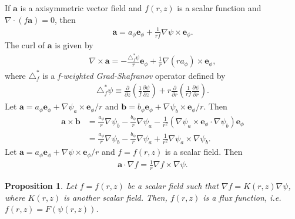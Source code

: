 \documentclass[reqno]{amsart}
\newcommand{\pfrac}[2]{\frac{\partial #1}{\partial #2}}
\newcommand{\mvec}[1]{\mathbf{#1}}
\newcommand{\eep}{\mvec{e}_\phi}
\newtheorem{prop}{Proposition}
\theoremstyle{definition}
\begin{document}
If $\mvec{a}$ is a axisymmetric vector field and $f(r,z)$ is a
scalar function and $\nabla \cdot (f\mvec{a}) = 0$, then
\begin{align}
  \mvec{a} = a_\phi \eep + \frac{1}{rf}\nabla\psi \times \eep.
\end{align}
The curl of $\mvec{a}$ is given by
\begin{align}
  \nabla\times\mvec{a} = -\frac{\triangle^*_f\psi}{r}\eep
  + \frac{1}{r} \nabla(ra_\phi)\times\eep, \label{eq:curlaf}
\end{align}
where $\triangle^*_f$ is a \emph{f-weighted Grad-Shafranov} operator
defined by
\begin{align}
  \triangle^*_f\psi \equiv 
  \frac{\partial}{\partial z}\left(\frac{1}{f} \pfrac{\psi}{z}\right)
  + r \frac{\partial}{\partial r}\left(\frac{1}{rf} \pfrac{\psi}{r}\right).
\end{align}
Let $\mvec{a}=a_\phi\eep + \nabla\psi_a \times \eep/r$ and $\mvec{b}=b_\phi\eep +
\nabla\psi_b \times \eep/r$. Then 
\begin{align}
  \mvec{a}\times\mvec{b} &=
  \frac{a_\phi}{r}\nabla\psi_b
  -
  \frac{b_\phi}{r}\nabla\psi_a
  -\frac{1}{r^2}(\nabla\psi_a \times \eep \cdot \nabla\psi_b)\eep \\
  &= \frac{a_\phi}{r}\nabla\psi_b
  -
  \frac{b_\phi}{r}\nabla\psi_a
  +\frac{1}{r^2}\nabla\psi_a \times \nabla\psi_b.
\end{align}
Let $\mvec{a}=a_\phi\eep + \nabla\psi \times \eep/r$ and $f=f(r,z)$ is
a scalar field. Then
\begin{align}
  \mvec{a}\cdot\nabla f = \frac{1}{r} \nabla f \times \nabla{\psi}.
\end{align}

\begin{prop}
  Let $f=f(r,z)$ be a scalar field such that $\nabla f = K(r,z) \nabla
  \psi$, where $K(r,z)$ is another scalar field. Then, $f(r,z)$ is a
  flux function, i.e. $f(r,z) = F(\psi(r,z))$.
\end{prop}
\end{document}
